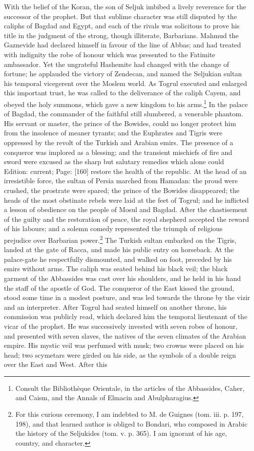 With the belief of the Koran, the son of Seljuk imbibed a lively reverence for the successor of the prophet. But that sublime character was still disputed by the caliphs of Bagdad and Egypt, and each of the rivals was solicitous to prove his title in the judgment of the strong, though illiterate, Barbarians. Mahmud the Gaznevide had declared himself in favour of the line of Abbas; and had treated with indignity the robe of honour which was presented to the Fatimite ambassador. Yet the ungrateful Hashemite had changed with the change of fortune; he applauded the victory of Zendecan, and named the Seljukian sultan his temporal vicegerent over the Moslem world. As Togrul executed and enlarged this important trust, he was called to the deliverance of the caliph Cayem, and obeyed the holy summons, which gave a new kingdom to his arms.\footnote{Consult the Bibliothèque Orientale, in the articles of the Abbassides, Caher, and Caism, and the Annals of Elmacin and Abulpharagius.} In the palace of Bagdad, the commander of the faithful still slumbered, a venerable phantom. His servant or master, the prince of the Bowides, could no longer protect him from the insolence of meaner tyrants; and the Euphrates and Tigris were oppressed by the revolt of the Turkish and Arabian emirs. The presence of a conqueror was implored as a blessing; and the transient mischiefs of fire and sword were excused as the sharp but salutary remedies which alone could Edition: current; Page: [160] restore the health of the republic. At the head of an irresistible force, the sultan of Persia marched from Hamadan: the proud were crushed, the prostrate were spared; the prince of the Bowides disappeared; the heads of the most obstinate rebels were laid at the feet of Togrul; and he inflicted a lesson of obedience on the people of Mosul and Bagdad. After the chastisement of the guilty and the restoration of peace, the royal shepherd accepted the reward of his labours; and a solemn comedy represented the triumph of religious prejudice over Barbarian power.\footnote{For this curious ceremony, I am indebted to M. de Guignes (tom. iii. p. 197, 198), and that learned author is obliged to Bondari, who composed in Arabic the history of the Seljukides (tom. v. p. 365). I am ignorant of his age, country, and character.} The Turkish sultan embarked on the Tigris, landed at the gate of Racca, and made his public entry on horseback. At the palace-gate he respectfully dismounted, and walked on foot, preceded by his emirs without arms. The caliph was seated behind his black veil; the black garment of the Abbassides was cast over his shoulders, and he held in his hand the staff of the apostle of God. The conqueror of the East kissed the ground, stood some time in a modest posture, and was led towards the throne by the vizir and an interpreter. After Togrul had seated himself on another throne, his commission was publicly read, which declared him the temporal lieutenant of the vicar of the prophet. He was successively invested with seven robes of honour, and presented with seven slaves, the natives of the seven climates of the Arabian empire. His mystic veil was perfumed with musk; two crowns were placed on his head; two scymetars were girded on his side, as the symbols of a double reign over the East and West. After this 